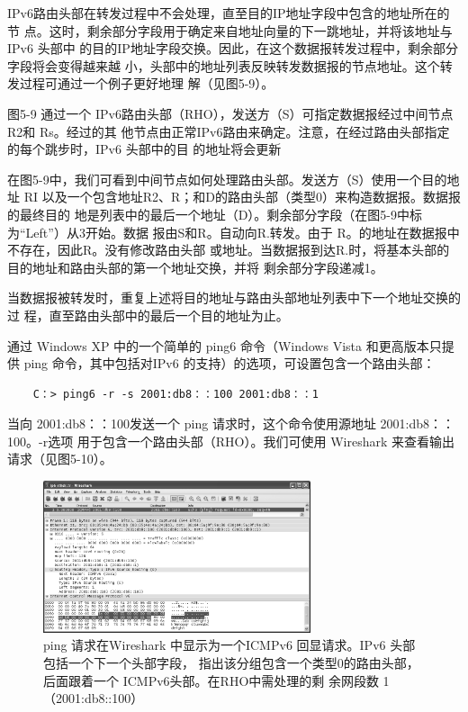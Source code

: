 IPv6路由头部在转发过程中不会处理，直至目的IP地址字段中包含的地址所在的节
点。这时，剩余部分字段用于确定来自地址向量的下一跳地址，并将该地址与IPv6 头部中
的目的IP地址字段交换。因此，在这个数据报转发过程中，剩余部分字段将会变得越来越
小，头部中的地址列表反映转发数据报的节点地址。这个转发过程可通过一个例子更好地理
解（见图5-9）。

图5-9 通过一个 IPv6路由头部（RHO），发送方（S）可指定数据报经过中间节点 R2和 Rs。经过的其
他节点由正常IPv6路由来确定。注意，在经过路由头部指定的每个跳步时，IPv6 头部中的目
的地址将会更新

在图5-9中，我们可看到中间节点如何处理路由头部。发送方（S）使用一个目的地址
RI 以及一个包含地址R2、R；和D的路由头部（类型0）来构造数据报。数据报的最终目的
地是列表中的最后一个地址（D）。剩余部分字段（在图5-9中标为“Left”）从3开始。数据
报由S和R。自动向R.转发。由于 R。的地址在数据报中不存在，因此R。没有修改路由头部
或地址。当数据报到达R.时，将基本头部的目的地址和路由头部的第一个地址交换，并将
剩余部分字段递减1。

当数据报被转发时，重复上述将目的地址与路由头部地址列表中下一个地址交换的过
程，直至路由头部中的最后一个目的地址为止。

通过 Windows XP 中的一个简单的 ping6 命令（Windows Vista 和更高版本只提供 ping
命令，其中包括对IPv6 的支持）的选项，可设置包含一个路由头部：
\begin{verbatim}
    C：> ping6 -r -s 2001:db8：：100 2001:db8：：1
\end{verbatim}

当向 2001:db8：：100发送一个 ping 请求时，这个命令使用源地址 2001:db8：：100。-r选项
用于包含一个路由头部（RHO）。我们可使用 Wireshark 来查看输出请求（见图5-10）。

\begin{figure}[!htb]
    \centering
	\includegraphics[width=0.7\textwidth]{imgs/5/5-10.png}
	\caption{ping 请求在Wireshark 中显示为一个ICMPv6 回显请求。IPv6 头部包括一个下一个头部字段，
            指出该分组包含一个类型0的路由头部，后面跟着一个 ICMPv6头部。在RHO中需处理的剩
            余网段数 1（2001:db8::100）}
\end{figure}


